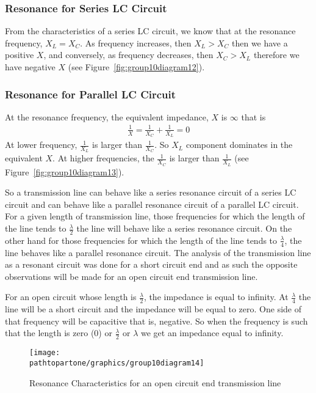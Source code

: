 \subsubsection{Resonance for Series LC Circuit}
From the characteristics of a series LC circuit, we know that at the resonance frequency, $X_L = X_C$. As frequency increases, then $ X_{L} > X_{C} $ then we have a positive $X$, and conversely, as frequency decreases, then $ X_{C} > X_{L} $ therefore we have negative $X$ (see Figure~\ref{fig:group10diagram12}).

\subsubsection{Resonance for Parallel LC Circuit}
At the resonance frequency, the equivalent impedance, $X$ is $\infty$ that is
\begin{align*}
\frac{1}{X} = \frac{1}{X_{C}} + \frac{1}{X_{L}} = 0
\end{align*}
At lower frequency, $ \frac{1}{X_{L}} $ is larger than $ \frac{1}{X_{C}} $. So $ X_{L} $ component dominates in the equivalent $X$. At higher frequencies, the $\frac{1}{X_C}$ is larger than $\frac{1}{X_L}$ (see Figure~\ref{fig:group10diagram13}).

So a transmission line can behave like a series resonance circuit of a series LC circuit and can behave like a parallel resonance circuit of a parallel LC circuit. For a given length of transmission line, those frequencies for which the length of the line tends to $ \frac{\lambda}{2} $ the line will behave like a series resonance circuit. On the other hand for those frequencies for which the length of the line tends to $ \frac{\lambda}{4} $, the line behaves like a parallel resonance circuit. The analysis of the transmission line as a resonant circuit was done for a short circuit end and as such the opposite observations will be made for an open circuit end transmission line.

For an open circuit whose length is $ \frac{\lambda}{2} $, the impedance is equal to infinity. At $ \frac{\lambda}{4} $ the line will be a short circuit and the impedance will be equal to zero. One side of that frequency will be capacitive that is, negative. So when the frequency is such that the length is zero (0) or $ \frac{\lambda}{2} $ or $ \lambda$ we get an impedance equal to infinity.
\begin{figure}[h]
\centering
\texttt{[image: \\pathtopartone/graphics/group10diagram14]}
\caption{Resonance Characteristics for an open circuit end transmission line}
\label{fig:group10diagram15}
\end{figure}


